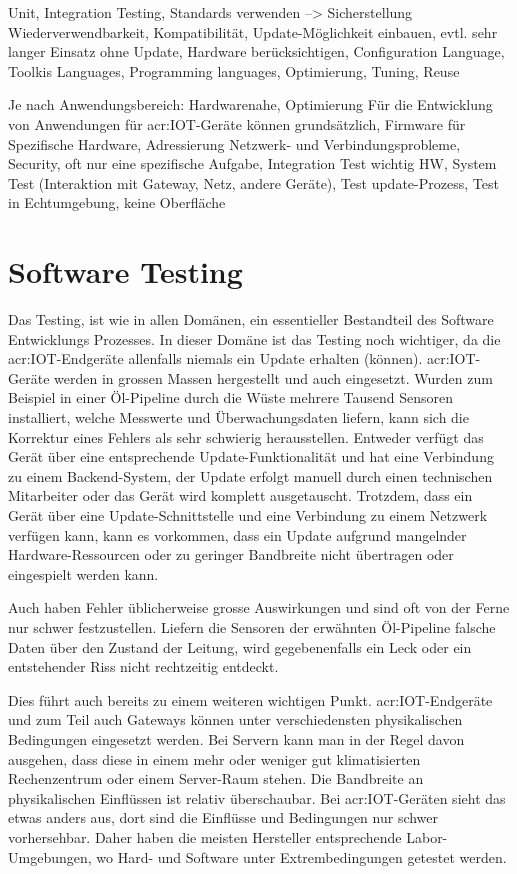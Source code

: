 Unit, Integration Testing, Standards verwenden --> Sicherstellung Wiederverwendbarkeit, Kompatibilität, Update-Möglichkeit einbauen, evtl. sehr langer Einsatz ohne Update, Hardware berücksichtigen, Configuration Language, Toolkis Languages, Programming languages, Optimierung, Tuning, Reuse

Je nach Anwendungsbereich: Hardwarenahe, Optimierung
Für die Entwicklung von Anwendungen für \gls{acr:IOT}-Geräte können grundsätzlich, 
Firmware für Spezifische Hardware, Adressierung Netzwerk- und Verbindungsprobleme, Security, oft nur eine spezifische Aufgabe, Integration Test wichtig HW, System Test (Interaktion mit Gateway, Netz, andere Geräte), Test update-Prozess, Test in Echtumgebung, keine Oberfläche



\section{Software Testing}
Das Testing, ist wie in allen Domänen, ein essentieller Bestandteil des Software Entwicklungs Prozesses. In dieser Domäne ist das Testing noch wichtiger, da die \gls{acr:IOT}-Endgeräte allenfalls niemals ein Update erhalten (können). \gls{acr:IOT}-Geräte werden in grossen Massen hergestellt und auch eingesetzt. Wurden zum Beispiel in einer Öl-Pipeline durch die Wüste mehrere Tausend Sensoren installiert, welche Messwerte und Überwachungsdaten liefern, kann sich die Korrektur eines Fehlers als sehr schwierig herausstellen. Entweder verfügt das Gerät über eine entsprechende Update-Funktionalität und hat eine Verbindung zu einem Backend-System, der Update erfolgt manuell durch einen technischen Mitarbeiter oder das Gerät wird komplett ausgetauscht. Trotzdem, dass ein Gerät über eine Update-Schnittstelle und eine Verbindung zu einem Netzwerk verfügen kann, kann es vorkommen, dass ein Update aufgrund mangelnder Hardware-Ressourcen oder zu geringer Bandbreite nicht übertragen oder eingespielt werden kann.

Auch haben Fehler üblicherweise grosse Auswirkungen und sind oft von der Ferne nur schwer festzustellen. Liefern die Sensoren der erwähnten Öl-Pipeline falsche Daten über den Zustand der Leitung, wird gegebenenfalls ein Leck oder ein entstehender Riss nicht rechtzeitig entdeckt.

Dies führt auch bereits zu einem weiteren wichtigen Punkt. \gls{acr:IOT}-Endgeräte und zum Teil auch Gateways können unter verschiedensten physikalischen Bedingungen eingesetzt werden. Bei Servern kann man in der Regel davon ausgehen, dass diese in einem mehr oder weniger gut klimatisierten Rechenzentrum oder einem Server-Raum stehen. Die Bandbreite an physikalischen Einflüssen ist relativ überschaubar. Bei \gls{acr:IOT}-Geräten sieht das etwas anders aus, dort sind die Einflüsse und Bedingungen nur schwer vorhersehbar. Daher haben die meisten Hersteller entsprechende Labor-Umgebungen, wo Hard- und Software unter Extrembedingungen getestet werden.

